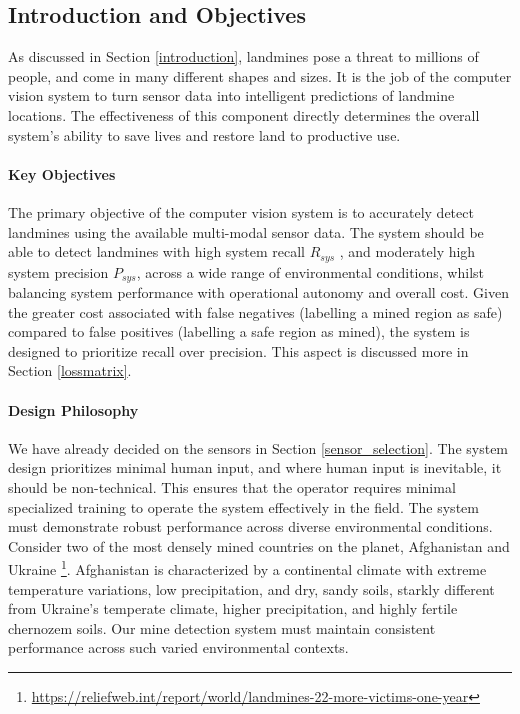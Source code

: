 \subsection{Introduction and Objectives} \label{compvis_intro}


As discussed in Section \ref{introduction}, landmines pose a threat to millions of people, and come in many different shapes and sizes. It is the job of the computer vision system to turn sensor data into intelligent predictions of landmine locations. The effectiveness of this component directly determines the overall system's ability to save lives and restore land to productive use.


\paragraph{Key Objectives}
The primary objective of the computer vision system is to accurately detect landmines using the available multi-modal sensor data. The system should be able to detect landmines with high system recall $R_{sys}$
, and moderately high system precision $P_{sys}$, across a wide range of environmental conditions, whilst balancing system performance with operational autonomy and overall cost. Given the greater cost associated with false negatives (labelling a mined region as safe) compared to false positives (labelling a safe region as mined), the system is designed to prioritize recall over precision. This aspect is discussed more in Section \ref{lossmatrix}.

\paragraph{Design Philosophy}

We have already decided on the sensors in Section \ref{sensor_selection}. The system design prioritizes minimal human input, and where human input is inevitable, it should be non-technical. This ensures that the operator requires minimal specialized training to operate the system effectively in the field.
The system must demonstrate robust performance across diverse environmental conditions. Consider two of the most densely mined countries on the planet, Afghanistan and Ukraine \footnote{\url{https://reliefweb.int/report/world/landmines-22-more-victims-one-year}}. Afghanistan is characterized by a continental climate with extreme temperature variations, low precipitation, and dry, sandy soils, starkly different from Ukraine's temperate climate, higher precipitation, and highly fertile chernozem soils. Our mine detection system must maintain consistent performance across such varied environmental contexts.

